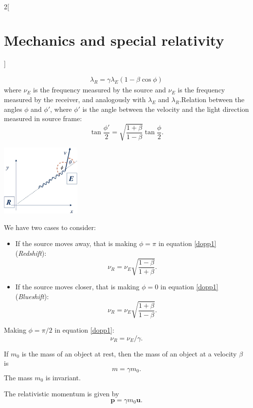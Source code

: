 \documentclass[class=article,10pt,crop=false]{standalone}
\begin{document}
\begin{multicols}{2}[\section{Mechanics and special relativity}]
\begin{concept}
\begin{gather}
    \lambda_R=\gamma\lambda_E(1-\beta\cos\phi)
\end{gather} where $\nu_E$ is the frequency measured by the source and $\nu_E$ is the frequency measured by the receiver, and analogously with $\lambda_E$ and $\lambda_R$.\newline Relation between the angles $\phi$ and $\phi'$, where $\phi'$ is the angle between the velocity and the light direction measured in source frame: 
$$\tan\frac{\phi'}{2}=\sqrt{\frac{1+\beta}{1-\beta}}\tan\frac{\phi}{2}.$$
\end{concept}
\begin{minipage}{\linewidth}
    \centering
    \includegraphics[width=4cm]{Physics/1st/Mechanics_and_special_relativity/Images/dop.jpg}
\end{minipage}
\begin{concept}
We have two cases to consider:
\begin{itemize}
    \item If the source moves away, that is making $\phi=\pi$ in equation \eqref{dopp1} (\textit{Redshift}):
   $$\nu_R=\nu_E\sqrt{\frac{1-\beta}{1+\beta}}.$$
    \item If the source moves closer, that is making $\phi=0$ in equation \eqref{dopp1} (\textit{Blueshift}):
   $$\nu_R=\nu_E\sqrt{\frac{1+\beta}{1-\beta}}.$$
\end{itemize}
\end{concept}
\begin{concept}
Making $\phi=\pi/2$ in equation \eqref{dopp1}:$$\nu_R=\nu_E/\gamma.$$
\end{concept}
\begin{concept}
If $m_0$ is the mass of an object at rest, then the mass of an object at a velocity $\beta$ is $$m=\gamma m_0.$$ The mass $m_0$ is invariant.
\end{concept}
\begin{concept}
The relativistic momentum is given by $$\boldsymbol{p}=\gamma m_0\boldsymbol{u}.$$

\end{concept}
\end{multicols}
\end{document}
